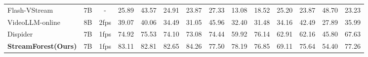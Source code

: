 \begin{table}[ht]
{\begin{tabular}{lccccccccccccc}
Flash-VStream   \cite{zhang2024flashvstream}            & 7B            & \multicolumn{1}{c|}{-}                 & 25.89                        & 43.57                        & 24.91                        & 23.87                        & 27.33                        & 13.08                        & 18.52                        & 25.20                        & 23.87                        & \multicolumn{1}{c|}{48.70}                        & 23.23                        \\
VideoLLM-online \cite{chen2024videollmonline}            & 8B            & \multicolumn{1}{c|}{2fps}              & 39.07                        & 40.06                        & 34.49                        & 31.05                        & 45.96                        & 32.40                        & 31.48                        & 34.16                        & 42.49                        & \multicolumn{1}{c|}{27.89}                        & 35.99                        \\
Dispider \cite{qian2025dispider}                   & 7B            & \multicolumn{1}{c|}{1fps}              & 74.92                        & 75.53                        & 74.10                        & 73.08                        & 74.44                        & 59.92                        & 76.14                        & 62.91                        & 62.16                        & \multicolumn{1}{c|}{45.80}                        & 67.63                        \\
\midrule
\textbf{StreamForest(Ours)} & {7B}   & \multicolumn{1}{c|}{{1fps}}     & 83.11                        & 82.81                        & 82.65                        & 84.26                        & 77.50                        & 78.19                        & 76.85                        & 69.11                        & 75.64                        & \multicolumn{1}{c|}{54.40}                        & 77.26                        \\  \midrule\midrule
\end{tabular}%
}

\label{app:tab:streamingbench}

\end{table}
